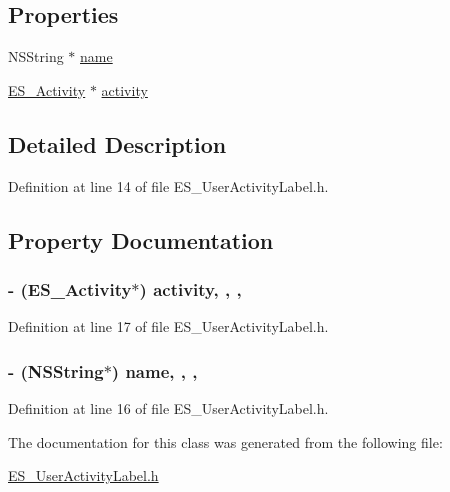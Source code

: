 \subsection*{Properties}
\begin{DoxyCompactItemize}
\item 
N\+S\+String $\ast$ \hyperlink{interface_e_s___user_activity_label_a03d6cdea4b5cb2f9ec2d081414102dcb}{name}
\item 
\hyperlink{interface_e_s___activity}{E\+S\+\_\+\+Activity} $\ast$ \hyperlink{interface_e_s___user_activity_label_ab9488eae959f6ac86db8be2cf20f60da}{activity}
\end{DoxyCompactItemize}


\subsection{Detailed Description}


Definition at line 14 of file E\+S\+\_\+\+User\+Activity\+Label.\+h.



\subsection{Property Documentation}
\hypertarget{interface_e_s___user_activity_label_ab9488eae959f6ac86db8be2cf20f60da}{
\subsubsection[{activity}]{\setlength{\rightskip}{0pt plus 5cm}-\/ ({\bf E\+S\+\_\+\+Activity}$\ast$) activity\hspace{0.3cm}{\ttfamily [read]}, {\ttfamily [write]}, {\ttfamily [nonatomic]}, {\ttfamily [retain]}}}\label{interface_e_s___user_activity_label_ab9488eae959f6ac86db8be2cf20f60da}


Definition at line 17 of file E\+S\+\_\+\+User\+Activity\+Label.\+h.

\hypertarget{interface_e_s___user_activity_label_a03d6cdea4b5cb2f9ec2d081414102dcb}{
\subsubsection[{name}]{\setlength{\rightskip}{0pt plus 5cm}-\/ (N\+S\+String$\ast$) name\hspace{0.3cm}{\ttfamily [read]}, {\ttfamily [write]}, {\ttfamily [nonatomic]}, {\ttfamily [retain]}}}\label{interface_e_s___user_activity_label_a03d6cdea4b5cb2f9ec2d081414102dcb}


Definition at line 16 of file E\+S\+\_\+\+User\+Activity\+Label.\+h.



The documentation for this class was generated from the following file\+:\begin{DoxyCompactItemize}
\item 
\hyperlink{_e_s___user_activity_label_8h}{E\+S\+\_\+\+User\+Activity\+Label.\+h}\end{DoxyCompactItemize}
